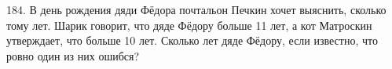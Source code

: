 184. В день рождения дяди Фёдора почтальон Печкин хочет выяснить, сколько тому лет. Шарик говорит, что дяде Фёдору больше 11 лет, а кот Матроскин утверждает, что больше 10 лет. Сколько лет дяде Фёдору, если известно, что ровно один из них ошибся?\\
